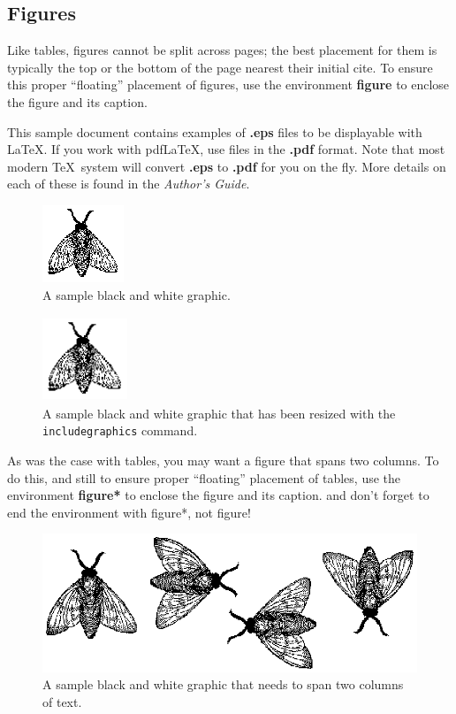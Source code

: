 \documentclass{sig-alternate-05-2015}
\begin{document}
\subsection{Figures}
Like tables, figures cannot be split across pages; the
best placement for them
is typically the top or the bottom of the page nearest
their initial cite.  To ensure this proper ``floating'' placement
of figures, use the environment
\textbf{figure} to enclose the figure and its caption.

This sample document contains examples of \textbf{.eps} files to be
displayable with \LaTeX.  If you work with pdf\LaTeX, use files in the
\textbf{.pdf} format.  Note that most modern \TeX\ system will convert
\textbf{.eps} to \textbf{.pdf} for you on the fly.  More details on
each of these is found in the \textit{Author's Guide}.

\begin{figure}
\centering
\includegraphics{fly}
\caption{A sample black and white graphic.}
\end{figure}

\begin{figure}
\centering
\includegraphics[height=1in, width=1in]{fly}
\caption{A sample black and white graphic
that has been resized with the \texttt{includegraphics} command.}
\end{figure}


As was the case with tables, you may want a figure
that spans two columns.  To do this, and still to
ensure proper ``floating'' placement of tables, use the environment
\textbf{figure*} to enclose the figure and its caption.
and don't forget to end the environment with
{figure*}, not {figure}!

\begin{figure}
\centering
\includegraphics{flies}
\caption{A sample black and white graphic
that needs to span two columns of text.}
\end{figure}
\end{document}
